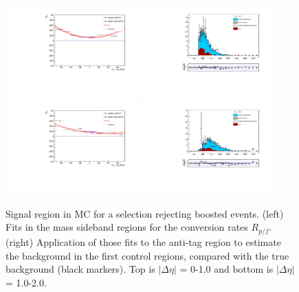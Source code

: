\begin{figure}[h]
\centering
\includegraphics[width=0.45\textwidth]{F5/HH4b2p1SR_Fit_BG_boost_dEta0_MCSR.pdf}
\includegraphics[width=0.45\textwidth]{F5/HH4b2p1_Plot_BG_boost_dEta0_MCSR.pdf}\\
\includegraphics[width=0.45\textwidth]{F5/HH4b2p1SR_Fit_BG_boost_dEta1_MCSR.pdf}
\includegraphics[width=0.45\textwidth]{F5/HH4b2p1_Plot_BG_boost_dEta1_MCSR.pdf}
\caption{Signal region in MC for a selection rejecting boosted events. (left) Fits in the mass sideband regions for the conversion rates $R_{p/f}$. (right) Application of those fits to the anti-tag region to estimate the background in the first control regions, compared with the true background (black markers). Top is $|\Delta\eta|$ = 0-1.0 and bottom is $|\Delta\eta|$ = 1.0-2.0.}
\label{fig:closureMC1}
\end{figure}

